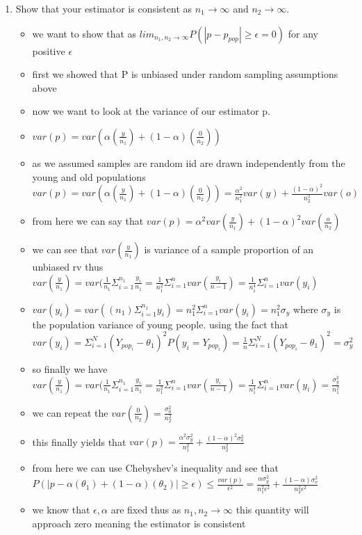 \documentclass[12pt,twoside]{article}
\begin{document}
\begin{enumerate}
\begin{enumerate}
\item Show that your estimator is consistent as $n_1 \rightarrow \infty$ and  $n_2 \rightarrow \infty$.
\begin{itemize}
    \item we want to show that as $lim_{n_1,n_2\rightarrow \infty}P(|p-p_{pop}|\geq \epsilon=0) $ for any positive $\epsilon$
    \item first we showed that P is unbiased under random sampling assumptions above
    \item now we want to look at the variance of our estimator p.
    \item $var(p)=var(\alpha(\frac{y}{n_1})+(1-\alpha)(\frac{0}{n_2}))$ 
    \item  as we assumed samples are random iid are drawn independently from the young and old populations  $var(p)=var(\alpha(\frac{y}{n_1})+(1-\alpha)(\frac{0}{n_2}))=\frac{\alpha^2}{n_1^2}var(y)+\frac{(1-\alpha)^2}{n_2^2}var(o)$
    \item from here we can say that $var(p)={\alpha^2}var(\frac{y}{n_1})+(1-\alpha)^2var(\frac{o}{n_2})$ 
    \item we can see that $var(\frac{y}{n_1})$ is variance of a sample proportion of an unbiased rv thus $var(\frac{y}{n_1})=var(\frac{1}{n_1}\Sigma_{i=1}^{n_1}\frac{y_i}{n_1}=\frac{1}{n_1^2}\Sigma_{i=1}^{n}var(\frac{y_i}{n-1})=\frac{1}{n_1^{4}}\Sigma_{i=1}^{n}var({y_i})$
    \item $var(y_i)=var((n_1)\Sigma_{i=1}^{n_1}y_i)=n_1^{2}\Sigma_{i=1}^{n}var(y_i)=n_1^{2}\sigma_{y}$ where $\sigma_{y}$ is the population variance of young people. using the fact that $var(y_i)=\Sigma_{i=1}^{N}(Y_{pop_i}-\theta_1)^2P(y_i=Y_{pop_i})=\frac{1}{n}\Sigma_{i=1}^{N}(Y_{pop_i}-\theta_1)^2=\sigma_{y}^2$
    \item so finally we have $var(\frac{y}{n_1})=var(\frac{1}{n_1}\Sigma_{i=1}^{n_1}\frac{y_i}{n_1}=\frac{1}{n_1^2}\Sigma_{i=1}^{n}var(\frac{y_i}{n-1})=\frac{1}{n_1^{4}}\Sigma_{i=1}^{n}var({y_i})=\frac{\sigma_{y}^2}{n_1^2}$
    \item we can repeat the $var(\frac{0}{n_2})=\frac{\sigma_{0}^2}{n_2^2}$
    \item this finally yields that $var(p)=\frac{\alpha^2 \sigma_{y}^2}{n_1^{2}}+\frac{(1-\alpha)^2 \sigma_{o}^2}{n_2^{2}}$
    \item from here we can use Chebyshev's inequality and see that $P(|p-\alpha(\theta_1)+(1-\alpha)(\theta_2)|\geq  \epsilon)\leq \frac{var(p)}{\epsilon^2}=\frac{\alpha\sigma_{y}^2}{n_1^2 \epsilon^2}+\frac{(1-\alpha)\sigma_{o}^2}{n_2^2 \epsilon^2}$
    \item we know that $\epsilon, \alpha$ are fixed thus as $n_1,n_2\rightarrow \infty$ this quantity will approach zero meaning the estimator is consistent 
\end{itemize}



\end{enumerate}
\end{enumerate}
\end{document}
